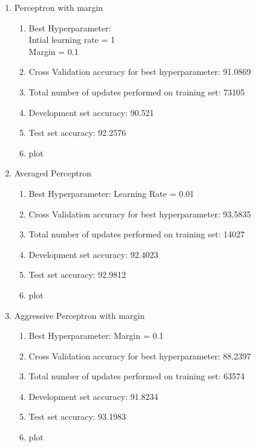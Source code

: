 \begin{enumerate}
\begin{enumerate}
		\item Perceptron with margin
			\begin{enumerate}
				\item Best Hyperparameter:\\ Intial learning rate = 1\\ Margin = 0.1
				\item Cross Validation accuracy for best hyperparameter: 91.0869
				\item Total number of updates performed on training set: 73105
				\item Development set accuracy: 90.521
				\item Test set accuracy: 92.2576
				\item plot
			\end{enumerate}
			
		\item Averaged Perceptron
			\begin{enumerate}
				\item Best Hyperparameter: Learning Rate = 0.01
				\item Cross Validation accuracy for best hyperparameter: 93.5835
				\item Total number of updates performed on training set: 14027
				\item Development set accuracy: 92.4023
				\item Test set accuracy: 92.9812
				\item plot
			\end{enumerate}

		\item Aggressive Perceptron with margin
			\begin{enumerate}
				\item Best Hyperparameter: Margin = 0.1
				\item Cross Validation accuracy for best hyperparameter: 88.2397
				\item Total number of updates performed on training set: 63574
				\item Development set accuracy: 91.8234
				\item Test set accuracy: 93.1983
				\item plot
			\end{enumerate}	
	
	\end{enumerate}

\end{enumerate}
